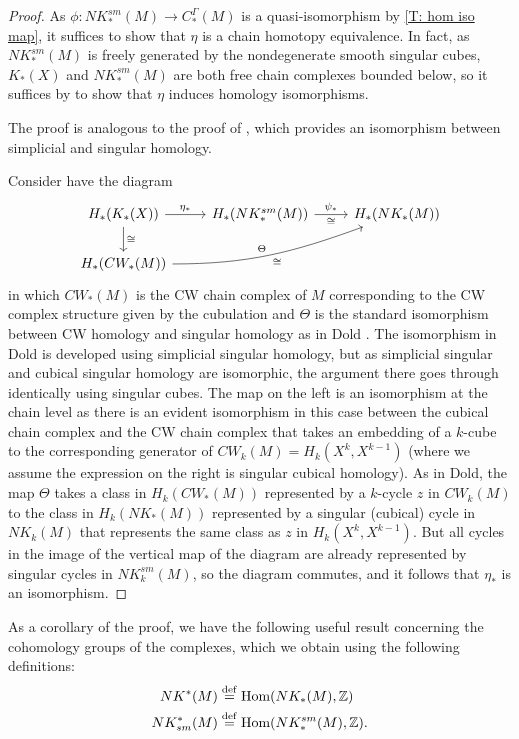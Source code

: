 \begin{proof}

	As $\phi \colon NK^{sm}_*(M) \to C^\Gamma_*(M)$ is a quasi-isomorphism by \cref{T: hom iso map}, it suffices to show that $\eta$ is a chain homotopy equivalence.
	In fact, as $NK^{sm}_*(M)$ is freely generated by the nondegenerate smooth singular cubes, $K_*(X)$ and $NK^{sm}_*(M)$ are both free chain complexes bounded below, so it suffices by \cite[Theorem 46.2]{Mun84} to show that $\eta$ induces homology isomorphisms.

	The proof is analogous to the proof of \cite[Proposition V.8.3]{Dol72}, which provides an isomorphism between simplicial and singular homology.

	Consider have the diagram
	\[
	\begin{tikzcd}
		H_*(K_*(X)) \arrow[r, "\eta_*"] \arrow[d, "\cong"] & H_*(NK^{sm}_*(M)) \arrow[r, "\psi_*", "\cong"'] & H_*(NK_*(M)) \\
		H_*(CW_*(M)) \arrow[rru, "\Theta", "\cong"', out=0, in=200] & &
	\end{tikzcd}
	\]
	in which $CW_*(M)$ is the CW chain complex of $M$ corresponding to the CW complex structure given by the cubulation and $\Theta$ is the standard isomorphism between CW homology and singular homology as in Dold \cite[Proposition V.1.9]{Dol72}.
	The isomorphism in Dold is developed using simplicial singular homology, but as simplicial singular and cubical singular homology are isomorphic, the argument there goes through identically using singular cubes.
	The map on the left is an isomorphism at the chain level as there is an evident isomorphism in this case between the cubical chain complex and the CW chain complex that takes an embedding of a $k$-cube to the corresponding generator of $CW_k(M) = H_k(X^k, X^{k-1})$ (where we assume the expression on the right is singular cubical homology).
	As in Dold, the map $\Theta$ takes a class in $H_k(CW_*(M))$ represented by a $k$-cycle $z$ in $CW_k(M)$ to the class in $H_k(NK_*(M))$ represented by a singular (cubical) cycle in $NK_k(M)$ that represents the same class as $z$ in $H_k(X^k,X^{k-1})$.
	But all cycles in the image of the vertical map of the diagram are already represented by singular cycles in $NK^{sm}_k(M)$, so the diagram commutes, and it follows that $\eta_*$ is an isomorphism.
\end{proof}

As a corollary of the proof, we have the following useful result concerning the cohomology groups of the complexes, which we obtain using the following definitions:
\begin{align*}
	NK^*(M)& \stackrel{\mathrm{def}}{=} \textup{Hom}(NK_*(M),\mathbb{Z})\\
	NK_{sm}^*(M)& \stackrel{\mathrm{def}}{=} \textup{Hom}(NK^{sm}_*(M),\mathbb{Z}).
\end{align*}

